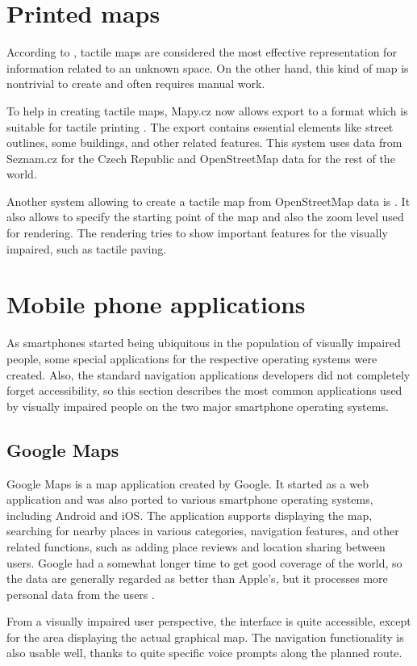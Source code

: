 \documentclass[nolof,digital]{fithesis3}
\begin{document}
\section{Printed maps}
According to \parencite{orientation_aids_from_foundations}, tactile maps are considered the most effective representation for information related to an unknown space. On the other hand, this kind of map is nontrivial to create and often requires manual work.

To help in creating tactile maps, Mapy.cz now allows export to a format which is suitable for tactile printing \parencite{mapycz}. The export contains essential elements like street outlines, some buildings, and other related features. This system uses data from Seznam.cz for the Czech Republic and OpenStreetMap data for the rest of the world.

Another system allowing to create a tactile map from OpenStreetMap data is \parencite{tactile_osm_maps}. It also allows to specify the starting point of the map and also the zoom level used for rendering. The rendering tries to show important features for the visually impaired, such as tactile paving.
\section{Mobile phone applications}
As smartphones started being ubiquitous in the population of visually impaired people, some special applications for the respective operating systems were created. Also, the standard navigation applications developers did not completely forget accessibility, so this section describes the most common applications used by visually impaired people on the two major smartphone operating systems.
\subsection{Google Maps}
Google Maps \parencite{googlemaps} is a map application created by Google. It started as a web application and was also ported to various smartphone operating systems, including Android and iOS. The application supports displaying the map, searching for nearby places in various categories, navigation features, and other related functions, such as adding place reviews and location sharing between users. Google had a somewhat longer time to get good coverage of the world, so the data are generally regarded as better than Apple's, but it processes more personal data from the users \parencite{mapcomp}.

From a visually impaired user perspective, the interface is quite accessible, except for the area displaying the actual graphical map. The navigation functionality is also usable well, thanks to quite specific voice prompts along the planned route.
\end{document}
